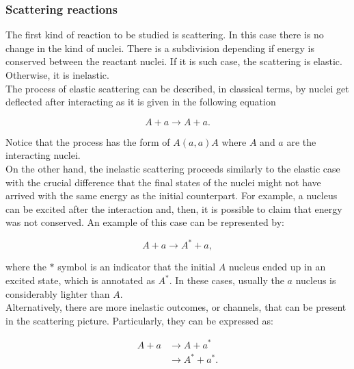 \documentclass[openany]{book}
\begin{document}
\subsubsection{Scattering reactions} \label{ssub:scatteringReactions}

The first kind of reaction to be studied is scattering. In this case there is no change in the kind of nuclei. There is a subdivision depending if energy is conserved between the reactant nuclei. If it is such case, the scattering is elastic. Otherwise, it is inelastic. \\

The process of elastic scattering can be described, in classical terms, by nuclei get deflected after interacting as it is given in the following equation

\begin{equation}  \label{eq:nuclearReaction_scattering_elastic}
	A + a \rightarrow A + a.
\end{equation}

Notice that the process has the form of $A(a, a)A$ where $A$ and $a$ are the interacting nuclei. \\

On the other hand, the inelastic scattering proceeds similarly to the elastic case with the crucial difference that the final states of the nuclei might not have arrived with the same energy as the initial counterpart. For example, a nucleus can be excited after the interaction and, then, it is possible to claim that energy was not conserved. An example of this case can be represented by:

\begin{equation}  \label{eq:nuclearReaction_scattering_inelastic}
	A + a \rightarrow A^{*} + a,
\end{equation}

where the $*$ symbol is an indicator that the initial $A$ nucleus ended up in an excited state, which is annotated as $A^{*}$. In these cases, usually the $a$ nucleus is considerably lighter than $A$.\\ 

Alternatively, there are more inelastic outcomes, or channels, that can be present in the scattering picture. Particularly, they can be expressed as: 

\begin{equation}  \label{eq:nuclearReaction_scattering_inelastic2}
	\begin{split}
	A + a 	&\rightarrow A + a^{*} \\
				&\rightarrow A^{*} + a^{*}.
\end{split}
\end{equation}
\end{document}
